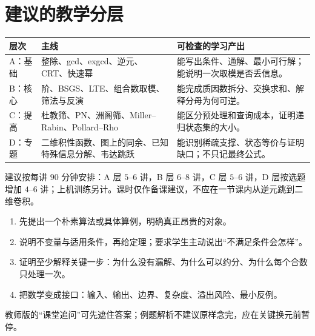 \documentclass[UTF8,a4paper,11pt,twoside,openright,fontset=fandol]{ctexbook}
\theoremstyle{definition}
\begin{document}
\section*{建议的教学分层}
\begin{longtable}{p{}p{}p{}}
\toprule
层次 & 主线 & 可检查的学习产出\\\midrule
A：基础 & 整除、gcd、exgcd、逆元、CRT、快速幂 & 能写出条件、通解、最小可行解；能说明一次取模是否丢信息。\\
B：核心 & 阶、BSGS、LTE、组合数取模、筛法与反演 & 能完成质因数拆分、交换求和、解释分母为何可逆。\\
C：提高 & 杜教筛、PN、洲阁筛、Miller--Rabin、Pollard--Rho & 能区分预处理和查询成本，证明递归状态集的大小。\\
D：专题 & 二维积性函数、图上的同余、已知特殊信息分解、韦达跳跃 & 能识别稀疏支撑、状态等价与证明缺口；不只记最终公式。\\
\bottomrule
\end{longtable}

建议按每讲 $90$ 分钟安排：A 层 $5$--$6$ 讲，B 层 $6$--$8$ 讲，C 层 $5$--$6$ 讲，D 层按选题增加 $4$--$6$ 讲；上机训练另计。课时仅作备课建议，不应在一节课内从逆元跳到二维卷积。

\begin{teach}[每个定理的四步讲法]
\begin{enumerate}
\item 先提出一个朴素算法或具体算例，明确真正昂贵的对象。
\item 说明不变量与适用条件，再给定理；要求学生主动说出“不满足条件会怎样”。
\item 证明至少解释关键一步：为什么没有漏解、为什么可以约分、为什么每个合数只处理一次。
\item 把数学变成接口：输入、输出、边界、复杂度、溢出风险、最小反例。
\end{enumerate}
教师版的“课堂追问”可先遮住答案；例题解析不建议原样念完，应在关键换元前暂停。
\end{teach}

\end{document}
